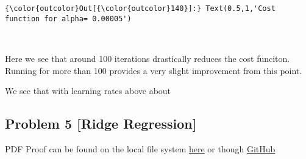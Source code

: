 \documentclass[11pt]{article}
\begin{document}
\begin{Verbatim}[commandchars=\\\{\}]
{\color{outcolor}Out[{\color{outcolor}140}]:} Text(0.5,1,'Cost function for alpha= 0.00005')
\end{Verbatim}
            
    \begin{center}
    \end{center}
    { \hspace*{\fill} \\}
    
    Here we see that around 100 iterations drastically reduces the cost
funciton. Running for more than 100 provides a very slight improvement
from this point.

We see that with learning rates above about

    \subsection{Problem 5 {[}Ridge
Regression{]}}\label{problem-5-ridge-regression}

PDF Proof can be found on the local file system
\href{./Derivation_of_Ridge_Regression.pdf}{here} or though
\href{https://github.com/cdilga/DS4400/blob/master/DS4400_HW1/Derivation_of_Ridge_Regression.pdf}{GitHub}
\end{document}
